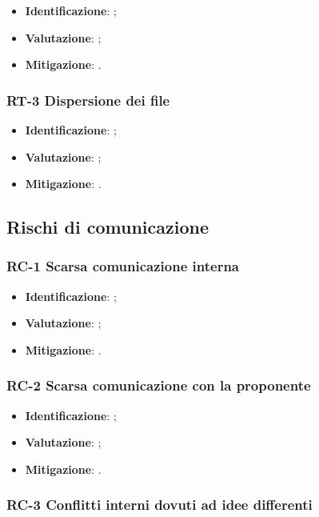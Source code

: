 \begin{itemize}
\setlength\itemsep{0em}
    \item \textbf{Identificazione}: ;
    \item \textbf{Valutazione}: ;
    \item \textbf{Mitigazione}: .
\end{itemize}

\subsubsection{RT-3 Dispersione dei file}

\begin{itemize}
\setlength\itemsep{0em}
    \item \textbf{Identificazione}: ;
    \item \textbf{Valutazione}: ;
    \item \textbf{Mitigazione}: .
\end{itemize}

\subsection{Rischi di comunicazione}
\subsubsection{RC-1 Scarsa comunicazione interna}

\begin{itemize}
\setlength\itemsep{0em}
    \item \textbf{Identificazione}: ;
    \item \textbf{Valutazione}: ;
    \item \textbf{Mitigazione}: .
\end{itemize}

\subsubsection{RC-2 Scarsa comunicazione con la proponente}

\begin{itemize}
\setlength\itemsep{0em}
    \item \textbf{Identificazione}: ;
    \item \textbf{Valutazione}: ;
    \item \textbf{Mitigazione}: .
\end{itemize}

\subsubsection{RC-3 Conflitti interni dovuti ad idee differenti}

